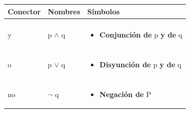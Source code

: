\documentclass[12pt, fleqn]{report}                             %
\theoremstyle{break}                                            %
\begin{document}
            \begin{longtable}{p{30mm} || p{30mm} || p{80mm}}

                \textbf{\large Conector} & \textbf{\large Nombres} & \textbf{\large Símbolos} \\[1.5ex]
                \hline\hline & & \\                                                                    
                \endhead                                                     

                \large y  &  \large{p $\land$ q}                                            &

                \begin{minipage}[t]{\textwidth}\begin{itemize}
                    \item \textbf{Conjunción de} p \textbf{y de} q
                \end{itemize}\end{minipage}                                                 \\[1.5ex]
                
                \hline & & \\ \large o  &  \large{p $\lor$ q}                               &
                
                \begin{minipage}[t]{\textwidth}\begin{itemize}
                    \item \textbf{Disyunción de} p \textbf{y de} q
                \end{itemize}\end{minipage}                                                 \\[1.5ex]


                \hline & & \\ \large no  &  \large{$\lnot$ q}                               &

                \begin{minipage}[t]{\textwidth}\begin{itemize}
                    \item \textbf{Negación de} P
                \end{itemize}\end{minipage}                                                 \\[1.5ex]


\end{longtable}
\end{document}
